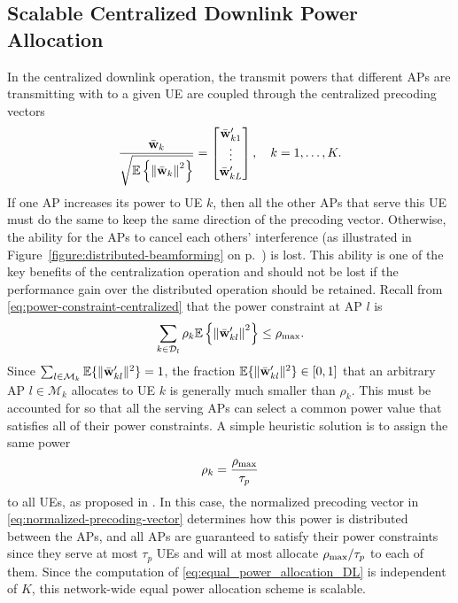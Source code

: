 \subsection{Scalable Centralized Downlink Power Allocation}

In the centralized downlink operation, the transmit powers that different APs are transmitting with to a given UE are coupled through the centralized precoding vectors
\begin{equation} \label{eq:normalized-precoding-vector}
\frac{\bar{\mathbf{w}}_k}{\sqrt{\mathbb{E} \left\{ \left\| \bar{\mathbf{w}}_k \right\|^2 \right\} }} = \begin{bmatrix} \bar{\mathbf{w}}_{k1}^{\prime} \\ \vdots \\  \bar{\mathbf{w}}_{kL}^{\prime} \end{bmatrix}, 
\quad k=1,\ldots,K.
\end{equation}
If one AP increases its power to UE $k$, then all the other APs that serve this UE must do the same to keep the same direction of the precoding vector. Otherwise, the ability for the APs to cancel each others' interference (as illustrated in Figure~\ref{figure:distributed-beamforming} on p.~\pageref{figure:distributed-beamforming}) is lost. This ability is one of the key benefits of the centralization operation and should not be lost if the performance gain over the distributed operation should be retained.
Recall from \eqref{eq:power-constraint-centralized} that the power constraint at AP $l$ is
\begin{equation} \label{eq:power-constraint-centralized2}
\sum_{k\in \mathcal{D}_l}\rho_k\mathbb{E} \left\{ \left\| \bar{\mathbf{w}}_{kl}^{\prime} \right\|^2 \right\} \leq \rho_{\textrm{max}}.
\end{equation}
Since $\sum_{l\in \mathcal{M}_k} \mathbb{E} \{ \| \bar{\mathbf{w}}_{kl}^{\prime} \|^2 \} = 1$, the fraction $\mathbb{E} \{ \| \bar{\mathbf{w}}_{kl}^{\prime} \|^2 \}  \in [0,1]$ that an arbitrary AP $l \in \mathcal{M}_k$ allocates to UE $k$ is generally much smaller than $\rho_k$. 
This must be accounted for so that all the serving APs can select a common power value that satisfies all of their power constraints.
A simple heuristic solution is to assign the same power
\begin{equation}\label{eq:equal_power_allocation_DL}
\rho_k = \frac{\rho_{\textrm{max}}}{\tau_p}
\end{equation}
to all UEs, as proposed in \cite{Bjornson2020a}.
 In this case, the normalized precoding vector in \eqref{eq:normalized-precoding-vector}
 determines how this power is distributed between the APs, and all APs are guaranteed to satisfy their power constraints since they serve at most $\tau_p$ UEs and will at most allocate $\rho_{\textrm{max}}/\tau_p$ to each of them. Since the computation of \eqref{eq:equal_power_allocation_DL} is independent of $K$, this network-wide equal power allocation scheme is scalable.

